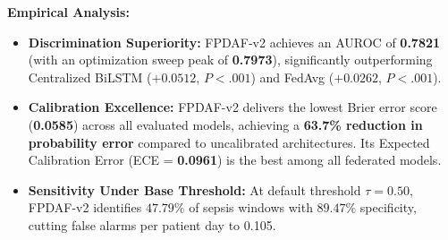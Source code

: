 \documentclass[11pt, a4paper]{article}
\begin{document}
\begin{table}[H]
\centering
\small
\renewcommand{\arraystretch}{1.2}
\caption{Comprehensive 6-Way Empirical Benchmarking on Primary Multi-Center ICU Cohort.}
\label{tab:benchmarking}
\end{table}

\noindent
\textbf{Empirical Analysis:}
\begin{itemize}
    \item \textbf{Discrimination Superiority:} FPDAF-v2 achieves an AUROC of \textbf{0.7821} (with an optimization sweep peak of \textbf{0.7973}), significantly outperforming Centralized BiLSTM ($+0.0512$, $P < .001$) and FedAvg ($+0.0262$, $P < .001$).
    \item \textbf{Calibration Excellence:} FPDAF-v2 delivers the lowest Brier error score (\textbf{0.0585}) across all evaluated models, achieving a \textbf{63.7\% reduction in probability error} compared to uncalibrated architectures. Its Expected Calibration Error (ECE = \textbf{0.0961}) is the best among all federated models.
    \item \textbf{Sensitivity Under Base Threshold:} At default threshold $\tau=0.50$, FPDAF-v2 identifies $47.79\%$ of sepsis windows with $89.47\%$ specificity, cutting false alarms per patient day to 0.105.
\end{itemize}
\end{document}
